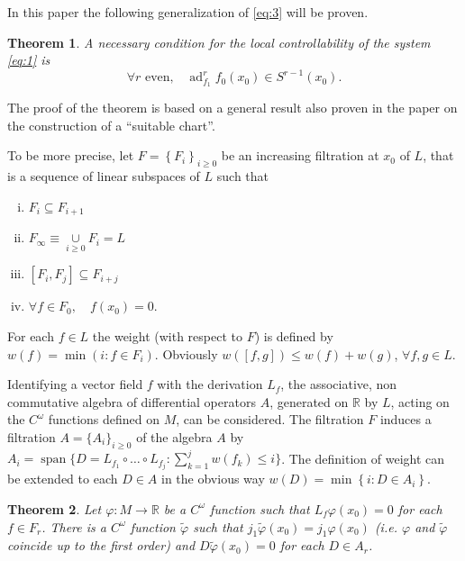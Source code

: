 \documentclass{article}
\newtheorem{theorem}{Theorem}
\newcommand{\R}{\mathbb{R}}
\begin{document}
In this paper the following generalization of \eqref{eq:3} will be proven.

\begin{theorem} \label{thm:1}
	 A necessary condition for the local controllability of the system \eqref{eq:1} is
	\begin{equation} \label{eq:4}
		\forall r \text{ even,} \quad
		\operatorname{ad}_{f_1}^r f_0\left(x_0\right) \in S^{r-1}\left(x_0\right).
	\end{equation}
\end{theorem}

The proof of the theorem is based on a general result also proven in the paper on the construction of a ``suitable chart''.

To be more precise, let $F=\left\{F_i\right\}_{i \geq 0}$ be an increasing filtration at $x_0$ of $L$, that is a sequence of linear subspaces of $L$ such that
\begin{enumerate}[i)]
	\item $F_i \subseteq F_{i+1}$
	\item $F_{\infty} \equiv \underset{i \geq 0}{\cup} F_i=L$
	\item $\left[F_i, F_j\right] \subseteq F_{i+j}$
	\item $\forall f \in F_0, \quad f\left(x_0\right)=0$.
\end{enumerate}
For each $f \in L$ the weight (with respect to $F$) is defined by $w(f)=\min (i: f \in F_i)$. 
Obviously $w([f, g]) \leq w(f)+w(g)$, $\forall f, g \in L$.

Identifying a vector field $f$ with the derivation $L_f$, the associative, non commutative algebra of differential operators $A$, generated on $\R$ by $L$, acting on the $C^\omega$ functions defined on $M$, can be considered.
The filtration $F$ induces a filtration $A=\{A_i\}_{i \geq 0}$ of the algebra $A$ by $A_i=\operatorname{span}\{D=L_{f_1} \circ \ldots \circ L_{f_j}: \sum_{k=1}^j w\left(f_k\right) \leq i\}$. 
The definition of weight can be extended to each $D \in A$ in the obvious way $w(D)=\min \left\{i: D \in A_i\right\}$.

\begin{theorem} \label{thm:2}
	Let $\varphi: M \to \R$ be a $C^\omega$ function such that $L_f \varphi\left(x_0\right)=0$ for each $f \in F_r$. 
	There is a $C^\omega$ function $\tilde{\varphi}$ such that $j_1 \tilde{\varphi}\left(x_0\right)=j_1 \varphi\left(x_0\right)$ (i.e. $\varphi$ and $\tilde{\varphi}$ coincide up to the first order) and $D \tilde{\varphi}\left(x_0\right)=0$ for each $D \in A_r$.
\end{theorem} 
\end{document}
